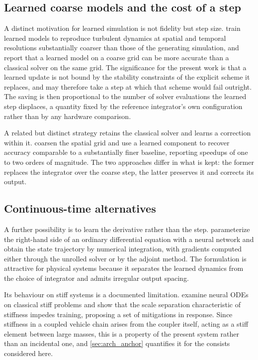\subsection{Learned coarse models and the cost of a step}
\label{sec:graph_coarse_models}

A distinct motivation for learned simulation is not fidelity but step size. \cite{stachenfeld2022coarse} train learned models to reproduce turbulent dynamics at spatial and temporal resolutions substantially coarser than those of the generating simulation, and report that a learned model on a coarse grid can be more accurate than a classical solver on the same grid. The significance for the present work is that a learned update is not bound by the stability constraints of the explicit scheme it replaces, and may therefore take a step at which that scheme would fail outright. The saving is then proportional to the number of solver evaluations the learned step displaces, a quantity fixed by the reference integrator's own configuration rather than by any hardware comparison.

A related but distinct strategy retains the classical solver and learns a correction within it. \cite{kochkov2021mlcfd} coarsen the spatial grid and use a learned component to recover accuracy comparable to a substantially finer baseline, reporting speedups of one to two orders of magnitude. The two approaches differ in what is kept: the former replaces the integrator over the coarse step, the latter preserves it and corrects its output.

\subsection{Continuous-time alternatives}
\label{sec:graph_neural_odes}

A further possibility is to learn the derivative rather than the step. \cite{chen2018neuralode} parameterize the right-hand side of an ordinary differential equation with a neural network and obtain the state trajectory by numerical integration, with gradients computed either through the unrolled solver or by the adjoint method. The formulation is attractive for physical systems because it separates the learned dynamics from the choice of integrator and admits irregular output spacing.

Its behaviour on stiff systems is a documented limitation. \cite{kim2021stiffneuralode} examine neural ODEs on classical stiff problems and show that the scale separation characteristic of stiffness impedes training, proposing a set of mitigations in response. Since stiffness in a coupled vehicle chain arises from the coupler itself, acting as a stiff element between large masses, this is a property of the present system rather than an incidental one, and \cref{sec:arch_anchor} quantifies it for the consists considered here.

